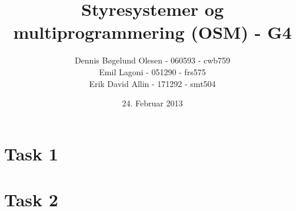 \documentclass[a4paper,12pt]{article}
\title{Styresystemer og multiprogrammering (OSM) - G4}
\author{Dennis Bøgelund Olesen - 060593 - cwb759 \\ Emil Lagoni - 051290 - frs575 \\ Erik David Allin - 171292 - smt504}
\date{24. Februar 2013}
\begin{document}
\maketitle %
\thispagestyle{empty}
\setcounter{page}{0}
\newpage




\section*{Task 1}

\section*{Task 2}
\end{document}
